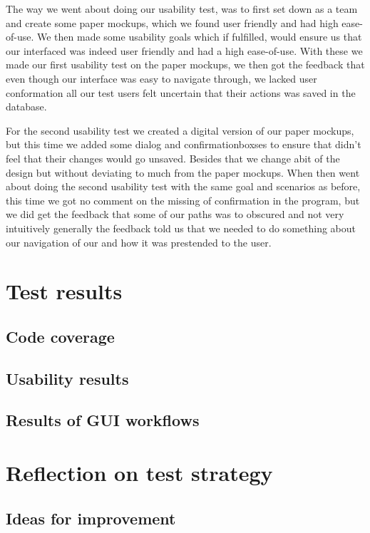 The way we went about doing our usability test, was to first set down as a team and create some paper mockups, which we found user friendly and had high ease-of-use. We then made some usability goals which if fulfilled, would ensure us that our interfaced was indeed user friendly and had a high ease-of-use. With these we made our first usability test on the paper mockups, we then got the feedback that even though our interface was easy to navigate through, we lacked user conformation all our test users felt uncertain that their actions was saved in the database.

For the second usability test we created a digital version of our paper mockups, but this time we added some dialog and confirmationboxses to ensure that didn't feel that their changes would go unsaved. Besides that we change abit of the design but without deviating to much from the paper mockups. When then went about doing the second usability test with the same goal and scenarios as before, this time we got no comment on the missing of confirmation in the program, but we did get the feedback that some of our paths was to obscured and not very intuitively generally the feedback told us that we needed to do something about our navigation of our and how it was prestended to the user.


\section{Test results}
\label{Testing_Results}

\subsection{Code coverage}
\label{Testing_Results_Coverage}

\subsection{Usability results}
\label{Testing_Results_Usability}

\subsection{Results of GUI workflows}
\label{Testing_Results_Workflows}

\section{Reflection on test strategy}
\label{Testing_Reflection}

\subsection{Ideas for improvement}
\label{Testing_Reflection_improvements}
